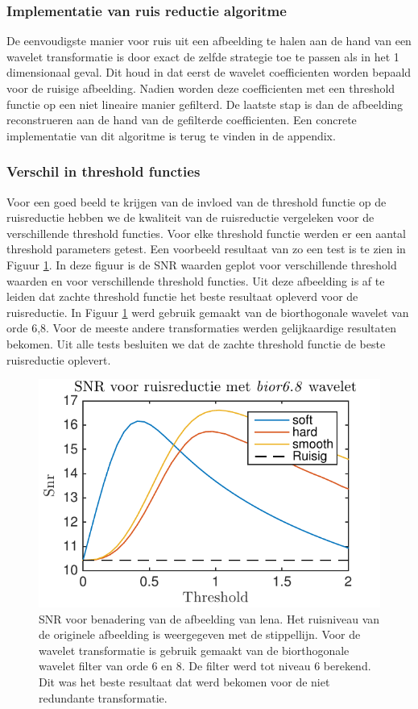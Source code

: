 \subsubsection{Implementatie van ruis reductie algoritme}


De eenvoudigste manier voor ruis uit een afbeelding te halen aan de hand van een wavelet transformatie is door exact de zelfde strategie toe te passen als in het 1 dimensionaal geval.
Dit houd in dat eerst de wavelet coefficienten worden bepaald voor de ruisige afbeelding.
Nadien worden deze coefficienten met een threshold functie op een niet lineaire manier gefilterd.
De laatste stap is dan de afbeelding reconstrueren aan de hand van de gefilterde coefficienten.
Een concrete implementatie van dit algoritme is terug te vinden in de appendix.

\subsubsection{Verschil in threshold functies}

Voor een goed beeld te krijgen van de invloed van de threshold functie op de ruisreductie hebben we de kwaliteit van de ruisreductie vergeleken voor de verschillende threshold functies.
Voor elke threshold functie werden er een aantal threshold parameters getest.
Een voorbeeld resultaat van zo een test is te zien in Figuur \ref{fig:snr_image_bior6}.
In deze figuur is de SNR waarden geplot voor  verschillende threshold waarden en voor verschillende threshold functies.
Uit deze afbeelding is af te leiden dat zachte threshold functie het beste resultaat opleverd voor de ruisreductie.
In Figuur \ref{fig:snr_image_bior6} werd gebruik gemaakt van de biorthogonale wavelet van orde 6,8.
Voor de meeste andere transformaties werden gelijkaardige resultaten bekomen.
Uit alle tests besluiten  we dat de zachte threshold functie de beste ruisreductie oplevert.


\begin{figure}
\centering
\includegraphics[width=0.7\linewidth]{../src/denoising/image/snr_image_bior68_30.pdf}
\caption{SNR voor benadering van de afbeelding van lena. Het ruisniveau van de originele afbeelding is weergegeven met de stippellijn. Voor de wavelet transformatie is gebruik gemaakt van de biorthogonale wavelet filter van orde 6 en 8. De filter werd tot niveau 6 berekend. Dit was het beste resultaat dat werd bekomen voor de niet redundante transformatie.}
\label{fig:snr_image_bior6}
\end{figure}



